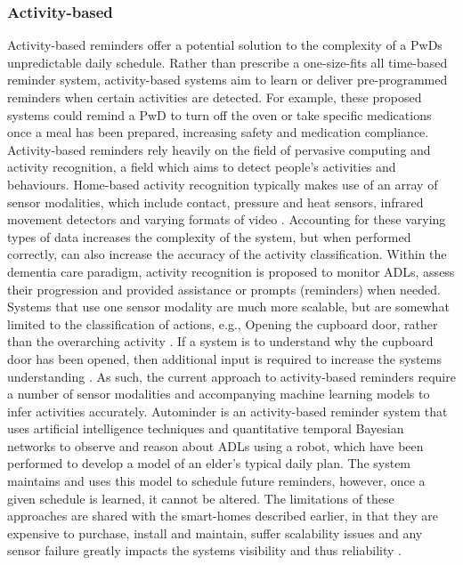 \subsubsection{Activity-based}
Activity-based reminders offer a potential solution to the complexity of a PwDs unpredictable daily schedule. Rather than prescribe a one-size-fits all time-based reminder system, activity-based systems aim to learn or deliver pre-programmed reminders when certain activities are detected. For example, these proposed systems could remind a PwD to turn off the oven or take specific medications once a meal has been prepared, increasing safety and medication compliance.
Activity-based reminders rely heavily on the field of pervasive computing and activity recognition, a field which aims to detect people's activities and behaviours. Home-based activity recognition typically makes use of an array of sensor modalities, which include contact, pressure and heat sensors, infrared movement detectors and varying formats of video \cite{Chen2012b}. Accounting for these varying types of data increases the complexity of the system, but when performed correctly, can also increase the accuracy of the activity classification. Within the dementia care paradigm, activity recognition is proposed to monitor ADLs, assess their progression and provided assistance or prompts (reminders) when needed. Systems that use one sensor modality are much more scalable, but are somewhat limited to the classification of actions, e.g., Opening the cupboard door, rather than the overarching activity \cite{Chen2012b, Patterson2015}. If a system is to understand why the cupboard door has been opened, then additional input is required to increase the systems understanding \cite{Chen2012}. As such, the current approach to activity-based reminders require a number of sensor modalities and accompanying machine learning models to infer activities accurately. Autominder \cite{Pollack2003} is an activity-based reminder system that uses artificial intelligence techniques and quantitative temporal Bayesian networks to observe and reason about ADLs using a robot, which have been performed to develop a model of an elder’s typical daily plan. The system maintains and uses this model to schedule future reminders, however, once a given schedule is learned, it cannot be altered.
The limitations of these approaches are shared with the smart-homes described earlier, in that they are expensive to purchase, install and maintain, suffer scalability issues \cite{Wilson2015a} and any sensor failure greatly impacts the systems visibility and thus reliability \cite{Ye2015}.

